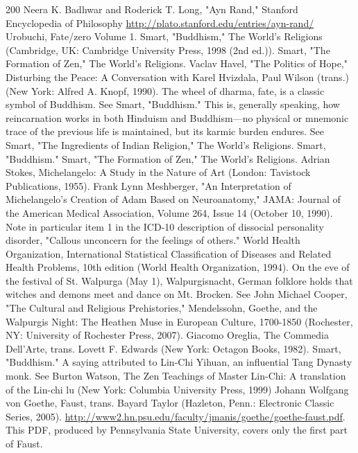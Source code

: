 \begin{thebibliography}{200}
    Neera K. Badhwar and Roderick T. Long, "Ayn Rand," Stanford Encyclopedia of Philosophy \url{http://plato.stanford.edu/entries/ayn-rand/}
    Urobuchi, Fate/zero Volume 1.
    Smart, "Buddhism," The World's Religions (Cambridge, UK: Cambridge University Press, 1998 (2nd ed.)).
    Smart, "The Formation of Zen," The World's Religions.
    Vaclav Havel, "The Politics of Hope," Disturbing the Peace: A Conversation with Karel Hvizdala, Paul Wilson (trans.) (New York: Alfred A. Knopf, 1990).
    The wheel of dharma, fate, is a classic symbol of Buddhism. See Smart, "Buddhism."
    This is, generally speaking, how reincarnation works in both Hinduism and Buddhism—no physical or mnemonic trace of the previous life is maintained, but its karmic burden endures. See Smart, "The Ingredients of Indian Religion," The World's Religions.
    Smart, "Buddhism."
    Smart, "The Formation of Zen," The World's Religions.
    Adrian Stokes, Michelangelo: A Study in the Nature of Art (London: Tavistock Publications, 1955).
    Frank Lynn Meshberger, "An Interpretation of Michelangelo's Creation of Adam Based on Neuroanatomy," JAMA: Journal of the American Medical Association, Volume 264, Issue 14 (October 10, 1990).
    Note in particular item 1 in the ICD-10 description of dissocial personality disorder, "Callous unconcern for the feelings of others." World Health Organization, International Statistical Classification of Diseases and Related Health Problems, 10th edition (World Health Organization, 1994).
    On the eve of the festival of St. Walpurga (May 1), Walpurgisnacht, German folklore holds that witches and demons meet and dance on Mt. Brocken. See John Michael Cooper, "The Cultural and Religious Prehistories," Mendelssohn, Goethe, and the Walpurgis Night: The Heathen Muse in European Culture, 1700-1850 (Rochester, NY: University of Rochester Press, 2007).
    Giacomo Oreglia, The Commedia Dell'Arte, trans. Lovett F. Edwards (New York: Octagon Books, 1982).
    Smart, "Buddhism."
    A saying attributed to Lin-Chi Yihuan, an influential Tang Dynasty monk. See Burton Watson, The Zen Teachings of Master Lin-Chi: A translation of the Lin-chi lu (New York: Columbia University Press, 1999)
    Johann Wolfgang von Goethe, Faust, trans. Bayard Taylor (Hazleton, Penn.: Electronic Classic Series, 2005). \url{http://www2.hn.psu.edu/faculty/jmanis/goethe/goethe-faust.pdf}. This PDF, produced by Pennsylvania State University, covers only the first part of Faust.

\end{thebibliography}
